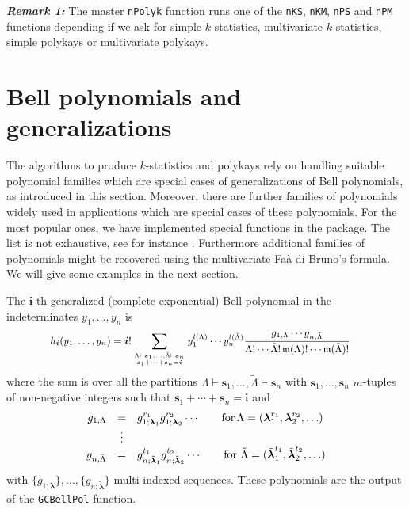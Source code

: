 \noindent \textbf{\emph{Remark 1:}} The master \texttt{nPolyk} function
runs one of the \texttt{nKS}, \texttt{nKM}, \texttt{nPS} and
\texttt{nPM} functions depending if we ask for simple \(k\)-statistics,
multivariate \(k\)-statistics, simple polykays or multivariate polykays.

\hypertarget{bell-polynomials-and-generalizations}{%
\section{Bell polynomials and
generalizations}\label{bell-polynomials-and-generalizations}}

The algorithms to produce \(k\)-statistics and polykays rely on handling
suitable polynomial families which are special cases of generalizations
of Bell polynomials, as introduced in this section. Moreover, there are
further families of polynomials widely used in applications which are
special cases of these polynomials. For the most popular ones, we have
implemented special functions in the  package. The
list is not exhaustive, see for instance \citet{MR741185}. Furthermore
additional families of polynomials might be recovered using the
multivariate Faà di Bruno's formula. We will give some examples in the
next section.

The \(\boldsymbol{i}\)-th generalized (complete exponential) Bell
polynomial in the indeterminates \(y_1, \ldots, y_n\) is
\begin{equation}
\hskip-0.5cm{\small h_{\boldsymbol{i}}(y_1, \ldots, y_n) = \boldsymbol{i}! \sum_{{\Lambda} \vdash \boldsymbol{s}_1, \ldots, \tilde{\Lambda} \vdash  \boldsymbol{s}_n \atop \boldsymbol{s}_1 + \cdots + \boldsymbol{s}_n = \boldsymbol{i}} y_1^{l(\Lambda)} \cdots y_n^{l(\tilde{\Lambda})} \frac{g_{1,\Lambda} \cdots g_{n,\tilde{\Lambda} }}{\Lambda!
\cdots \tilde{\Lambda}! \, \mathfrak{m}(\Lambda)! \cdots \mathfrak{m}(\tilde{\Lambda})!}}\!\!\!
\label{(sol22ter)}
\end{equation} where the sum is over all the partitions
\({\Lambda} \vdash \boldsymbol{s}_1, \ldots, \tilde{\Lambda} \vdash \boldsymbol{s}_n\)
with \(\boldsymbol{s}_1,\ldots,\boldsymbol{s}_n\) \(m\)-tuples of
non-negative integers such that
\(\boldsymbol{s}_1 + \cdots + \boldsymbol{s}_n = \boldsymbol{i}\) and
\begin{equation}
\begin{array}{rcl}
g_{1,\Lambda} & = & g_{1; \boldsymbol{\lambda}_1}^{r_1} g_{1; \boldsymbol{\lambda}_2}^{r_2} \cdots \qquad \hbox{for}  \, \Lambda=(\boldsymbol{\lambda}_1^{r_1} , \boldsymbol{\lambda}_2^{r_2}, \ldots) \\
& \vdots & \\
g_{n,\tilde{\Lambda}} & = &  g_{n; \tilde{\boldsymbol{\lambda}}_1}^{t_1} g_{n; \tilde{\boldsymbol{\lambda}}_2}^{t_2} \cdots \qquad \hbox{for}  \,\, \tilde{\Lambda}=(\tilde{\boldsymbol{\lambda}}_1^{t_1} , \tilde{\boldsymbol{\lambda}}_2^{t_2}, \ldots)
\label{sequences}
\end{array}
\end{equation} with
\(\{ g_{1; \boldsymbol{\lambda}}\}, \ldots, \{ g_{n; \boldsymbol{\tilde{\lambda}}}\}\)
multi-indexed sequences. These polynomials are the output of the
\texttt{GCBellPol} function.

